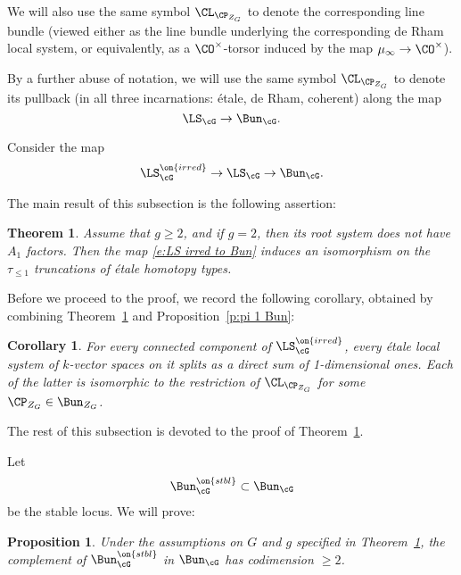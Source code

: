 \documentclass[9pt]{amsart}
\newtheorem{cor}[subsubsection]{Corollary}
\newtheorem{prop}[subsubsection]{Proposition}
\newtheorem{thm}[subsubsection]{Theorem}
\theoremstyle{remark}
\theoremstyle{definition}
\theoremstyle{remark}
\newcommand{\thmref}[1]{Theorem~\ref{#1}}
\newcommand{\propref}[1]{Proposition~\ref{#1}}
\numberwithin{equation}{section}
\begin{document}
\medskip

We will also use the same symbol $\CL_{\CP_{Z_G}}$ to denote the corresponding line bundle (viewed either
as the line bundle underlying the corresponding de Rham local system, or equivalently, as a $\CO^\times$-torsor
induced by the map $\mu_\infty\to \CO^\times$). 

\medskip

By a further abuse of notation, we will use the same symbol $\CL_{\CP_{Z_G}}$ to denote its pullback
(in all three incarnations: \'etale, de Rham, coherent) along the map
$$\LS_\cG\to \Bun_\cG.$$


\sssec{}

Consider the map
\begin{equation} \label{e:LS irred to Bun}
\LS_\cG^{\on{irred}}\to \LS_\cG\to \Bun_\cG.
\end{equation}

The main result of this subsection is the following assertion:

\begin{thm} \label{t:pi 1 LS}
Assume that $g\geq 2$, and if $g=2$, then its root system does not have $A_1$ factors. 
Then the map \eqref{e:LS irred to Bun} induces an isomorphism on the 
$\tau_{\leq 1}$ truncations of \'etale homotopy types.
\end{thm} 

Before we proceed to the proof, we record the following corollary, obtained by combining
\thmref{t:pi 1 LS} and \propref{p:pi 1 Bun}:

\begin{cor} \label{c:pi 1 LS}
For every connected component of $\LS_\cG^{\on{irred}}$, every \'etale
local system of $k$-vector spaces on it splits as a direct sum of 1-dimensional ones. 
Each of the latter is isomorphic to the restriction of $\CL_{\CP_{Z_G}}$ for
some $\CP_{Z_G}\in \Bun_{Z_G}$.
\end{cor}

The rest of this subsection is devoted to the proof of \thmref{t:pi 1 LS}. 

\sssec{}

Let 
$$\Bun_\cG^{\on{stbl}}\subset \Bun_\cG$$
be the stable locus. We will prove:

\begin{prop} \label{p:compl 1}
Under the assumptions on $G$ and $g$ specified in \thmref{t:pi 1 LS}, the complement
of $\Bun_\cG^{\on{stbl}}$ in $\Bun_\cG$ has codimension $\geq 2$.
\end{prop}
\end{document}
